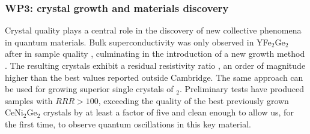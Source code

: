 %
{}



\subsubsection*{WP3: crystal growth and materials discovery}
\noindent
Crystal quality plays a central role in the discovery of new collective phenomena in quantum materials. %
Bulk superconductivity was only observed in YFe$_2$Ge$_2$ after  in sample quality , culmi\-nating in the introduction of a new growth method . %
The resulting crystals
exhibit a residual resistivity ratio %
 , an order of magnitude higher than the best values
reported outside Cambridge. The same approach can be used for growing superior single crystals of $_2$. Preliminary tests have produced samples with $RRR >100$, exceeding the quality of the best previously grown CeNi$_2$Ge$_2$ crystals by at least a factor of five and clean enough to allow us, for the first time, to observe quantum oscillations in this key material. %


